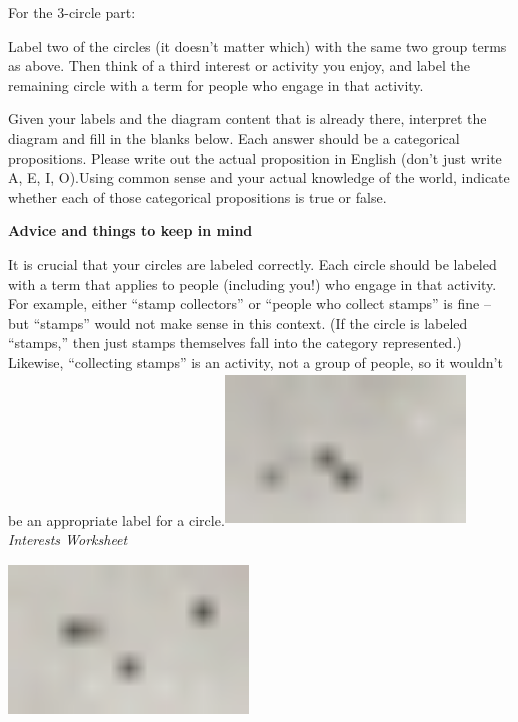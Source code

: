 \documentclass[oneside, openany]{book} %
\begin{document}
\noindent 

\noindent For the 3-circle part:

\noindent 

\noindent  Label two of the circles (it doesn't matter which) with the same two group terms as above. Then think of a third interest or activity you enjoy, and label the remaining circle with a term for people who engage in that activity.

\noindent 

\noindent  Given your labels and the diagram content that is already there, interpret the diagram and fill in the blanks below. Each answer should be a categorical propositions. Please write out the actual proposition in English (don't just write A, E, I, O).Using  common sense and your  actual  knowledge of the world, indicate whether each of those categorical propositions is true or false.

\noindent 

\noindent 

\noindent \textbf{Advice and things to keep in mind}

\noindent 

\noindent 

\noindent 

\noindent It is crucial that your circles are labeled correctly. Each circle should be labeled with a term that applies to people (including you!) who engage in that activity. For example, either ``stamp collectors'' or ``people who collect stamps'' is fine -- but ``stamps'' would not make sense in this context. (If the circle is labeled ``stamps,'' then just stamps themselves fall into the category represented.) Likewise, ``collecting stamps'' is an activity, not a group of people, so it wouldn't be an appropriate label for a circle.\includegraphics*[width=2.51in, height=1.59in, keepaspectratio=false]{image2}\textit{Interests Worksheet}

\noindent 

\noindent 

\noindent 

\noindent \includegraphics*[width=2.51in, height=1.59in, keepaspectratio=false]{image3}
\end{document}
